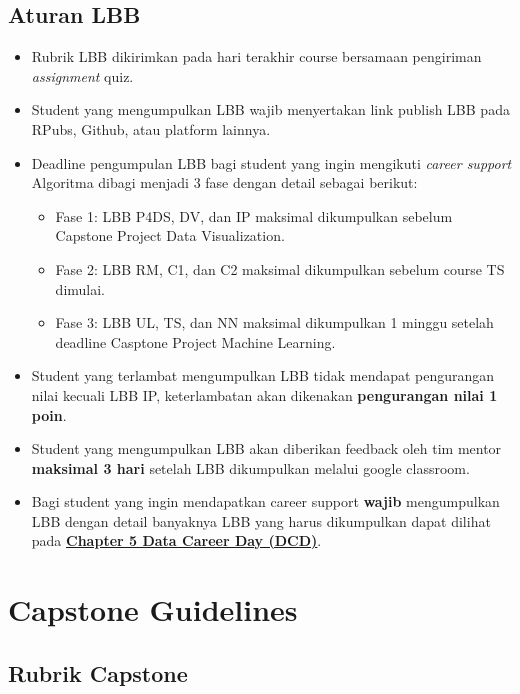 \documentclass[
]{book}
\providecommand{\tightlist}{%
  \setlength{\itemsep}{0pt}\setlength{\parskip}{0pt}}
\begin{document}
\hypertarget{aturan-lbb}{%
\subsection{Aturan LBB}\label{aturan-lbb}}

\begin{itemize}
\tightlist
\item
  Rubrik LBB dikirimkan pada hari terakhir course bersamaan pengiriman \emph{assignment} quiz.
\item
  Student yang mengumpulkan LBB wajib menyertakan link publish LBB pada RPubs, Github, atau platform lainnya.
\item
  Deadline pengumpulan LBB bagi student yang ingin mengikuti \emph{career support} Algoritma dibagi menjadi 3 fase dengan detail sebagai berikut:

  \begin{itemize}
  \tightlist
  \item
    Fase 1: LBB P4DS, DV, dan IP maksimal dikumpulkan sebelum Capstone Project Data Visualization.
  \item
    Fase 2: LBB RM, C1, dan C2 maksimal dikumpulkan sebelum course TS dimulai.
  \item
    Fase 3: LBB UL, TS, dan NN maksimal dikumpulkan 1 minggu setelah deadline Casptone Project Machine Learning.
  \end{itemize}
\item
  Student yang terlambat mengumpulkan LBB tidak mendapat pengurangan nilai kecuali LBB IP, keterlambatan akan dikenakan \textbf{pengurangan nilai 1 poin}.
\item
  Student yang mengumpulkan LBB akan diberikan feedback oleh tim mentor \textbf{maksimal 3 hari} setelah LBB dikumpulkan melalui google classroom.
\item
  Bagi student yang ingin mendapatkan career support \textbf{wajib} mengumpulkan LBB dengan detail banyaknya LBB yang harus dikumpulkan dapat dilihat pada \href{https://algoritma4dummies.netlify.app/data-career-day-dcd.html\#the-day-dcd}{\textbf{Chapter 5 Data Career Day (DCD)}}.
\end{itemize}

\hypertarget{capstone-guidelines}{%
\section{Capstone Guidelines}\label{capstone-guidelines}}

\hypertarget{rubrik-capstone}{%
\subsection{Rubrik Capstone}\label{rubrik-capstone}}
\end{document}
